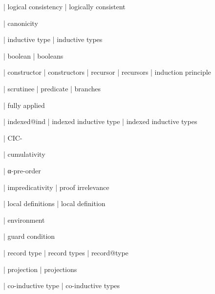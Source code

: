   | logical consistency
  | logically consistent

  | canonicity


  | inductive type
  | inductive types

  | boolean
  | booleans

  | constructor
  | constructors
  | recursor
  | recursors
  | induction principle

  | scrutinee
  | predicate
  | branches

  | fully applied

  | indexed@ind
  | indexed inductive type
  | indexed inductive types

  | CIC-


  | cumulativity

  | α-pre-order

  | impredicativity
  | proof irrelevance

  | local definitions
  | local definition

  | environment

  | guard condition

  | record type
  | record types
  | record@type

  | projection
  | projections

  | co-inductive type
  | co-inductive types
